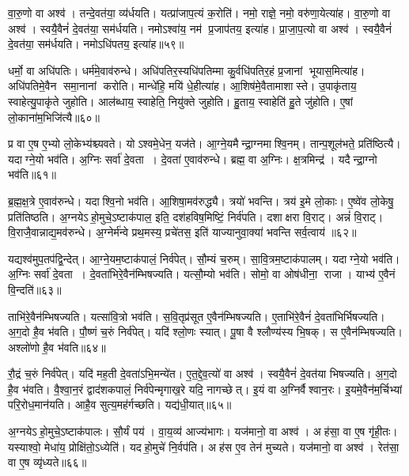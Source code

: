 वा॒रु॒णो वा अश्व॑।
तन्दे॒वत॑या॒ व्य॑र्धयति।
यत्प्रा॑जाप॒त्यं क॒रोति॑।
नमो॒ राज्ञे॒ नमो॒ वरु॑णा॒येत्या॑ह।
वा॒रु॒णो वा अश्व॑।
स्वयै॒वैनं॑ दे॒वत॑या॒ सम॑र्धयति।
नमोऽश्वा॑य॒ नम॑ प्र॒जाप॑तय॒ इत्या॑ह।
प्रा॒जा॒प॒त्यो वा अश्व॑।
स्वयै॒वैनं॑ दे॒वत॑या॒ सम॑र्धयति।
नमोऽधि॑पतय॒ इत्या॑ह॥५९॥

धर्मो॒ वा अधि॑पतिः।
धर्म॑मे॒वाव॑रुन्धे।
अधि॑पतिर॒स्यधि॑पतिम्मा कु॒र्वधि॑पतिर॒हं प्र॒जानां भूयास॒मित्या॑ह।
अधि॑पतिमे॒वैन समा॒नानां करोति।
मान्धे॑हि॒ मयि॑ धे॒हीत्या॑ह।
आ॒शिष॑मे॒वैतामाशास्ते।
उ॒पाकृ॑ताय॒ स्वाहेत्यु॒पाकृ॑ते जुहोति।
आल॑ब्धाय॒ स्वाहेति॒ नियु॑क्ते जुहोति।
हु॒ताय॒ स्वाहेति॑ हु॒ते जु॑होति।
ए॒षां लो॒काना॑म॒भिजि॑त्यै॥६०॥

प्र वा ए॒ष ए॒भ्यो लो॒केभ्य॑श्च्यवते।
योऽश्वमे॒धेन॒ यज॑ते।
आ॒ग्ने॒यमैन्द्रा॒ग्नमाश्वि॒नम्।
तान्प॒शूल॑भते॒ प्रति॑ष्ठित्यै।
यदाग्ने॒यो भव॑ति।
अ॒ग्निः सर्वा॑ दे॒वता।
दे॒वता॑ ए॒वाव॑रुन्धे।
ब्रह्म॒ वा अ॒ग्निः।
क्ष॒त्रमिन्द्र॑।
यदैन्द्रा॒ग्नो भव॑ति॥६१॥

ब्र॒ह्म॒क्ष॒त्रे ए॒वाव॑रुन्धे।
यदाश्वि॒नो भव॑ति।
आ॒शिषा॒मव॑रुद्ध्यै।
त्रयो॑ भवन्ति।
त्रय॑ इ॒मे लो॒काः।
ए॒ष्वे॑व लो॒केषु॒ प्रति॑तिष्ठति।
अ॒ग्नयेऽहो॒मुचे॒ऽष्टाक॑पाल॒ इति॒ दश॑हविष॒मिष्टिं॒ निर्व॑पति।
दशाक्षरा वि॒राट्।
अन्नं॑ वि॒राट्।
वि॒राजै॒वान्नाद्य॒मव॑रुन्धे।
अ॒ग्नेर्म॑न्वे प्रथ॒मस्य॒ प्रचे॑तस॒ इति॑ याज्यानुवा॒क्या॑ भवन्ति सर्व॒त्वाय॑ ॥६२॥\anuvakamend[अधि॑पतय॒ इत्या॑हा॒भि॑जित्या ऐन्द्रा॒ग्नो भव॑ति रुन्ध॒ एकं च]

यद्यश्व॑मुप॒तप॑द्वि॒न्देत्।
आ॒ग्ने॒यम॒ष्टाक॑पालं॒ निर्व॑पेत्।
सौ॒म्यं च॒रुम्।
सा॒वि॒त्रम॒ष्टाक॑पालम्।
यदाग्ने॒यो भव॑ति।
अ॒ग्निः सर्वा॑ दे॒वता।
दे॒वता॑भिरे॒वैन॑म्भिषज्यति।
यत्सौ॒म्यो भव॑ति।
सोमो॒ वा ओष॑धीना॒ राजा।
याभ्य॑ ए॒वैनं वि॒न्दति॑॥६३॥

ताभि॑रे॒वैन॑म्भिषज्यति।
यत्सा॑वि॒त्रो भव॑ति।
स॒वि॒तृप्र॑सूत ए॒वैन॑म्भिषज्यति।
ए॒ताभि॑रे॒वैनं॑ दे॒वता॑भिर्भिषज्यति।
अ॒ग॒दो है॒व भ॑वति।
पौ॒ष्णं च॒रुं निर्व॑पेत्।
यदि॑ श्लो॒णः स्यात्।
पू॒षा वै श्लौण्य॑स्य भि॒षक्।
स ए॒वैन॑म्भिषज्यति।
अश्लो॑णो है॒व भ॑वति॥६४॥

रौ॒द्रं च॒रुं निर्व॑पेत्।
यदि॑ मह॒ती दे॒वता॑ऽभि॒मन्ये॑त।
ए॒त॒द्दे॒व॒त्यो॑ वा अश्व॑।
स्वयै॒वैनं॑ दे॒वत॑या भिषज्यति।
अ॒ग॒दो है॒व भ॑वति।
वै॒श्वा॒न॒रं द्वाद॑शकपालं॒ निर्व॑पेन्मृगाख॒रे यदि॒ नागच्छेत्।
इ॒यं वा अ॒ग्निर्वैश्वान॒रः।
इ॒यमे॒वैन॑म॒र्चिभ्यां परि॒रोध॒मान॑यति।
आहै॒व सुत्य॒मह॑र्गच्छति।
यद्य॑धी॒यात्॥६५॥

अ॒ग्नयेऽहो॒मुचे॒ऽष्टाक॑पालः।
सौ॒र्यं पय॑।
वा॒य॒व्य॑ आज्य॑भागः।
यज॑मानो॒ वा अश्व॑।
अह॑सा॒ वा ए॒ष गृ॑ही॒तः।
यस्याश्वो॒ मेधा॑य॒ प्रोक्षि॑तो॒ऽध्येति॑।
यदहो॒मुचे॑ नि॒र्वप॑ति।
अह॑स ए॒व तेन॑ मुच्यते।
यज॑मानो॒ वा अश्व॑।
रेत॑सा॒ वा ए॒ष व्यृ॑ध्यते॥६६॥

